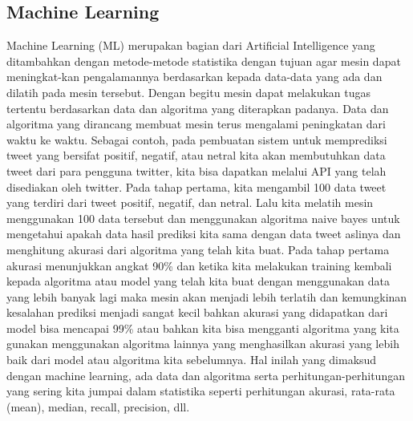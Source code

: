 \subsection{Machine Learning}
Machine Learning (ML) merupakan bagian dari Artificial Intelligence yang ditambahkan dengan metode-metode statistika dengan tujuan agar mesin dapat meningkat-kan pengalamannya berdasarkan kepada data-data yang ada dan dilatih pada mesin tersebut. Dengan begitu mesin dapat melakukan tugas tertentu berdasarkan data dan algoritma yang diterapkan padanya. Data dan algoritma yang dirancang membuat mesin terus mengalami peningkatan dari waktu ke waktu. Sebagai contoh, pada pembuatan sistem untuk memprediksi tweet yang bersifat positif, negatif, atau netral kita akan membutuhkan data tweet dari para pengguna twitter, kita bisa dapatkan melalui API yang telah disediakan oleh twitter. Pada tahap pertama, kita mengambil 100 data tweet yang terdiri dari tweet positif, negatif, dan netral. Lalu kita melatih mesin menggunakan 100 data tersebut dan menggunakan algoritma naive bayes untuk mengetahui apakah data hasil prediksi kita sama dengan data tweet aslinya dan menghitung akurasi dari algoritma yang telah kita buat. Pada tahap pertama akurasi menunjukkan angkat 90\% dan ketika kita melakukan training kembali kepada algoritma atau model yang telah kita buat dengan menggunakan data yang lebih banyak lagi maka mesin akan menjadi lebih terlatih dan kemungkinan kesalahan prediksi menjadi sangat kecil bahkan akurasi yang didapatkan dari model bisa mencapai 99\% atau bahkan kita bisa mengganti algoritma yang kita gunakan menggunakan algoritma lainnya yang menghasilkan akurasi yang lebih baik dari model atau algoritma kita sebelumnya. Hal inilah yang dimaksud dengan machine learning, ada data dan algoritma serta perhitungan-perhitungan yang sering kita jumpai dalam statistika seperti perhitungan akurasi, rata-rata (mean), median, recall, precision, dll.

